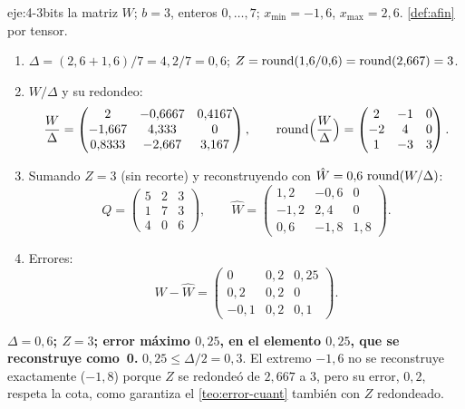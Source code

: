 \begin{solucion}{eje:4-3bits}
\datos la matriz $W$; $b=3$, enteros $0,\dots,7$; $x_{\min}=-1{,}6$, $x_{\max}=2{,}6$.
\planteamiento \cref{def:afin} por tensor.
\pasos
\begin{enumerate}[label=\arabic*.]
  \item $\Delta=(2{,}6+1{,}6)/7=4{,}2/7=0{,}6$; $Z=\operatorname{round}(1{,}6/0{,}6)=\operatorname{round}(2{,}667)=3$.
  \item $W/\Delta$ y su redondeo:
  \[
  \frac{W}{\Delta}=\begin{pmatrix}2 & -0{,}6667 & 0{,}4167\\ -1{,}667 & 4{,}333 & 0\\ 0{,}8333 & -2{,}667 & 3{,}167\end{pmatrix},\qquad
  \operatorname{round}\Bigl(\frac{W}{\Delta}\Bigr)=\begin{pmatrix}2 & -1 & 0\\ -2 & 4 & 0\\ 1 & -3 & 3\end{pmatrix}.
  \]
  \item Sumando $Z=3$ (sin recorte) y reconstruyendo con $\hat W=0{,}6\,\operatorname{round}(W/\Delta)$:
  \[
  Q=\begin{pmatrix}5 & 2 & 3\\ 1 & 7 & 3\\ 4 & 0 & 6\end{pmatrix},\qquad
  \hat W=\begin{pmatrix}1{,}2 & -0{,}6 & 0\\ -1{,}2 & 2{,}4 & 0\\ 0{,}6 & -1{,}8 & 1{,}8\end{pmatrix}.
  \]
  \item Errores:
  \[
  W-\hat W=\begin{pmatrix}0 & 0{,}2 & 0{,}25\\ 0{,}2 & 0{,}2 & 0\\ -0{,}1 & 0{,}2 & 0{,}1\end{pmatrix}.
  \]
\end{enumerate}
\resultado \textbf{$\Delta=0{,}6$; $Z=3$; error máximo $0{,}25$, en el elemento $0{,}25$, que se reconstruye como~0.}
\comprobacion $0{,}25\le\Delta/2=0{,}3$. El extremo $-1{,}6$ no se reconstruye exactamente ($-1{,}8$) porque $Z$ se redondeó de $2{,}667$ a $3$, pero su error, $0{,}2$, respeta la cota, como garantiza el \cref{teo:error-cuant} también con $Z$ redondeado.
\end{solucion}

